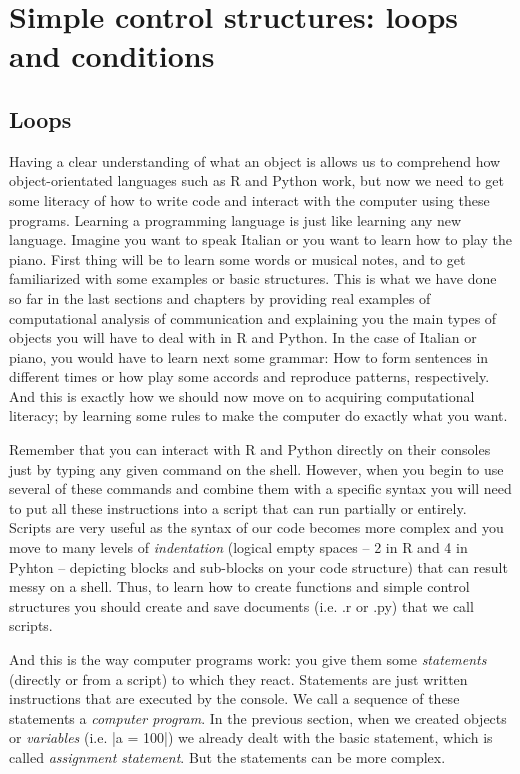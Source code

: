 \section{Simple control structures: loops and conditions}	

\subsection{Loops}
Having a clear understanding of what an object is allows us to
comprehend how object-orientated languages such as R and Python work,
but now we need to get some literacy of how to write code and interact
with the computer using these programs. Learning a programming
language is just like learning any new language.  Imagine you want to
speak Italian or you want to learn how to play the piano. First thing
will be to learn some words or musical notes, and to get familiarized
with some examples or basic structures. This is what we have done so
far in the last sections and chapters by providing real examples of
computational analysis of communication and explaining you the main
types of objects you will have to deal with in R and Python. In the
case of Italian or piano, you would have to learn next some grammar:
How to form sentences in different times or how play some accords and
reproduce patterns, respectively. And this is exactly how we should
now move on to acquiring computational literacy; by learning some
rules to make the computer do exactly what you want.

Remember that you can interact with R and Python directly on their
consoles just by typing any given command on the shell. However, when
you begin to use several of these commands and combine them with a
specific syntax you will need to put all these instructions into a
script that can run partially or entirely. Scripts are very useful as
the syntax of our code becomes more complex and you move to many
levels of \emph{indentation} (logical empty spaces -- 2 in R and 4 in
Pyhton -- depicting blocks and sub-blocks on your code structure) that
can result messy on a shell. Thus, to learn how to create functions
and simple control structures you should create and save documents
(i.e. .r or .py) that we call scripts.

And this is the way computer programs work: you give them some
\emph{statements} (directly or from a script) to which they
react. Statements are just written instructions that are executed by
the console.  We call a sequence of these statements a \emph{computer
  program}. In the previous section, when we created objects or
\emph{variables} (i.e. |a = 100|) we already dealt
with the basic statement, which is called \emph{assignment
  statement}. But the statements can be more complex.

